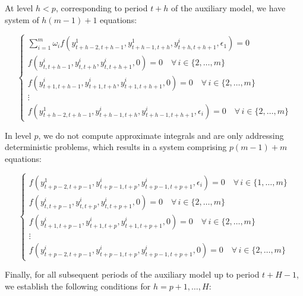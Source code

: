 \documentclass[a4paper,11pt]{amsart}
\begin{document}
At level \(h < p\), corresponding to period \( t+h \) of the auxiliary
model, we have system of \( h(m-1)+1 \) equations:

\begin{equation}
   \label{sep:sparse:3}\tag{5.d}
   \begin{cases}
      \sum_{i=1}^m\omega_i f\left( y_{t+h-2,t+h-1}^1, y_{t+h-1,t+h}^1, y_{t+h, t+h+1}^i, \epsilon_1 \right) = 0 \\
      f\left(y_{t,t+h-1}^i, y_{t,t+h}^i, y_{t,t+h+1}^i, 0\right) = 0\quad \forall\, i\in\{2,\ldots,m\}          \\
      f\left(y_{t+1,t+h-1}^i, y_{t+1,t+h}^i, y_{t+1, t+h+1}^i, 0\right) = 0\quad \forall\, i\in\{2,\ldots,m\}   \\
      \vdots                                                                                                    \\
      f\left(y_{t+h-2,t+h-1}^1, y_{t+h-1,t+h}^i, y_{t+h-1,t+h+1}^i, \epsilon_i \right) = 0 \quad \forall\, i\in\{2,\ldots,m\}
   \end{cases}
\end{equation}

In level \(p\), we do not compute approximate integrals and are only
addressing deterministic problems, which results in a system
comprising \( p(m-1)+m \) equations:

\begin{equation}
   \label{sep:sparse:4}\tag{5.e}
   \begin{cases}
      f\left(y_{t+p-2,t+p-1}^1, y_{t+p-1,t+p}^i, y_{t+p-1,t+p+1}^i, \epsilon_i\right) = 0 \quad \forall\, i\in\{1,\ldots,m\} \\
      f\left(y_{t,t+p-1}^i, y_{t,t+p}^i, y_{t,t+p+1}^i, 0\right) = 0 \quad \forall\, i\in\{2,\ldots,m\}                      \\
      f\left(y_{t+1,t+p-1}^i, y_{t+1,t+p}^i, y_{t+1, t+p+1}^i, 0\right) = 0 \quad \forall\, i\in\{2,\ldots,m\}               \\
      \vdots                                                                                                                 \\
      f\left(y_{t+p-2,t+p-1}^i, y_{t+p-1,t+p}^i, y_{t+p-1,t+p+1}^i, 0 \right) = 0 \quad \forall\, i\in\{2,\ldots,m\}
   \end{cases}
\end{equation}

Finally, for all subsequent periods of the auxiliary model up to
period \(t+H-1\), we establish the following conditions
for \(h=p+1,\dots,H\):
\end{document}
